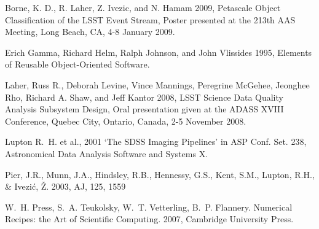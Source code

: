 \begin{thebibliography}{}

 Borne, K. D., R. Laher, Z. Ivezic, and N. Hamam 2009,
   Petascale Object Classification of the LSST Event Stream, 
   Poster presented at the 213th AAS Meeting, Long Beach, CA, 4-8 January 2009.

Erich Gamma, Richard Helm, Ralph Johnson, and John Vlissides 1995,
Elements of Reusable Object-Oriented Software.

 Laher, Russ R., Deborah Levine, Vince Mannings, 
   Peregrine McGehee, Jeonghee Rho, Richard A. Shaw, and Jeff Kantor 2008,
   LSST Science Data Quality Analysis Subsystem Design,
   Oral presentation given at the ADASS XVIII Conference, Quebec City, Ontario, Canada, 
   2-5 November 2008.

Lupton R.~H. et al., 2001 `The SDSS Imaging Pipelines' in
ASP Conf. Set. 238, Astronomical Data Analysis Software and Systems X.
   
 Pier, J.R., Munn, J.A., Hindsley, R.B., Hennessy, G.S.,
Kent, S.M., Lupton, R.H., \& Ivezi\'c, \v{Z}. 2003, AJ, 125, 1559

  W.~H. Press,  S.~A. Teukolsky, W.~T. Vetterling, B.~P. Flannery.
  Numerical Recipes: the Art of Scientific Computing.
  2007, Cambridge University Press.
   
\end{thebibliography}
